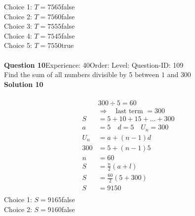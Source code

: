 \documentclass{article}
\begin{document}
Choice 1: \hspace{20pt}$T=7565$\hspace{20pt}false\\
Choice 2: \hspace{20pt}$T=7560$\hspace{20pt}false\\
Choice 3: \hspace{20pt}$T=7555$\hspace{20pt}false\\
Choice 4: \hspace{20pt}$T=7545$\hspace{20pt}false\\
Choice 5: \hspace{20pt}$T=7550$\hspace{20pt}true\\
\\[4pt]
\noindent\textbf{Question 10}\hspace{20pt}Experience: 40\hspace{20pt}Order: \hspace{20pt}Level: \hspace{20pt}Question-ID: 109\\[2pt]
Find the sum of all numbers divisible by 5 between $1$ and $300$\\[4pt]
\noindent\textbf{Solution 10}\\[2pt]
\\[-35pt]\begin{align*}
&300 \div 5 = 60\\[2pt]
&\Rightarrow \quad \text{last term }= 300\\[2pt]
S&=5+10+15+...+300\\[12pt]
a&=5\quad d=5 \quad U_n=300\\[2pt]
U_n&=a+(n-1)d\\[2pt]
300&=5+(n-1)5\\[2pt]
n&=60\\[12pt]
S&=\displaystyle\frac{n}{2}(a+l)\\[2pt]
S&=\displaystyle\frac{60}{2}(5+300)\\[2pt]
S&=9150\\[-50pt]
\end{align*}
Choice 1: \hspace{20pt}$S=9165$\hspace{20pt}false\\
Choice 2: \hspace{20pt}$S=9160$\hspace{20pt}false\\
\end{document}
